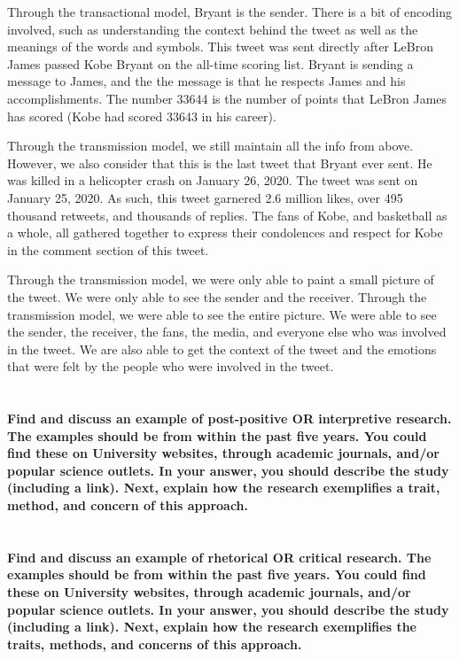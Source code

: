\documentclass[a4paper]{article}
\begin{document}
        Through the transactional model, Bryant is the sender. There is a bit of encoding involved, such as understanding
        the context behind the tweet as well as the meanings of the words and symbols. This tweet was sent directly 
        after LeBron James passed Kobe Bryant on the all-time scoring list. Bryant is sending a message to James, and the
        the message is that he respects James and his accomplishments. The number 33644 is the number of points that 
        LeBron James has scored (Kobe had scored 33643 in his career). 

        Through the transmission model, we still maintain all the info from above. However, we also consider that this is 
        the last tweet that Bryant ever sent. He was killed in a helicopter crash on January 26, 2020. The tweet was sent
        on January 25, 2020. As such, this tweet garnered 2.6 million likes, over 495 thousand retweets, and 
        thousands of replies. The fans of Kobe, and basketball as a whole, all gathered together to express their 
        condolences and respect for Kobe in the comment section of this tweet. 

        Through the transmission model, we were only able to paint a small picture of the tweet. We were only able to see
        the sender and the receiver. Through the transmission model, we were able to see the entire picture. We were able
        to see the sender, the receiver, the fans, the media, and everyone else who was involved in the tweet. We are also 
        able to get the context of the tweet and the emotions that were felt by the people who were involved in the tweet.



    \section{}
        \textbf{Find and discuss an example of post-positive OR interpretive research. The examples should be from within the past five years. You could find these on University websites, through academic journals, and/or popular science outlets. In your answer, you should describe the study (including a link). Next, explain how the research exemplifies a trait, method, and concern of this approach.}

    \section{}
        \textbf{Find and discuss an example of rhetorical OR critical research. The examples should be from within the past five years. You could find these on University websites, through academic journals, and/or popular science outlets. In your answer, you should describe the study (including a link). Next, explain how the research exemplifies the traits, methods, and concerns of this approach.}
    
	\pagebreak    
    
    
    \cite{wood2017}
    \cite{kobeTweet}
\end{document}
